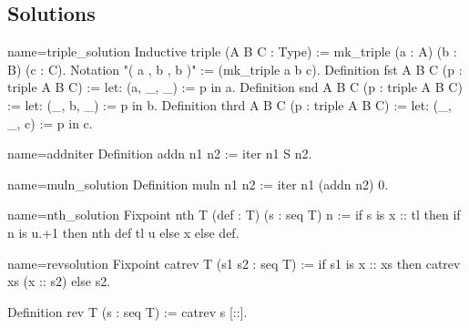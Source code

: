 \subsection{Solutions}


\begin{Answer}[ref=ex:triple]

\begin{coq}{name=triple_solution}{}
Inductive triple (A B C : Type) := mk_triple (a : A) (b : B) (c : C).
Notation "( a , b , b )" := (mk_triple a b c).
Definition fst  A B C (p : triple A B C) := let: (a, _, _) := p in a.
Definition snd  A B C (p : triple A B C) := let: (_, b, _) := p in b.
Definition thrd A B C (p : triple A B C) := let: (_, _, c) := p in c.
\end{coq}

\end{Answer}

\begin{Answer}[ref=ex:iteradd]

\begin{coq}{name=addniter}{}
Definition addn n1 n2 := iter n1 S n2.
\end{coq}

\end{Answer}

\begin{Answer}[ref=ex:itermul]

\begin{coq}{name=muln_solution}{}
Definition muln n1 n2 := iter n1 (addn n2) 0.
\end{coq}

\end{Answer}

\begin{Answer}[ref=ex:nth]

\begin{coq}{name=nth_solution}{}
Fixpoint nth T (def : T) (s : seq T) n :=
  if s is x :: tl then if n is u.+1 then nth def tl u else x else def.
\end{coq}

\end{Answer}

\begin{Answer}[ref=ex:rev]

\begin{coq}{name=revsolution}{}
Fixpoint catrev T (s1 s2 : seq T) :=
  if s1 is x :: xs then catrev xs (x :: s2) else s2.

Definition rev T (s : seq T) := catrev s [::].
\end{coq}

\end{Answer}

